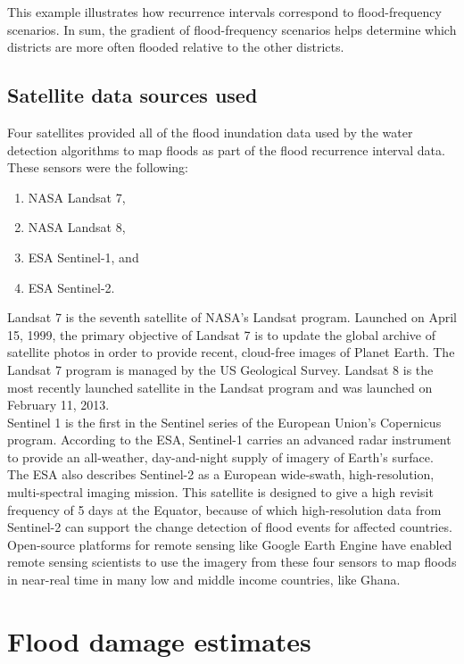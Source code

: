 This example illustrates how recurrence intervals correspond to flood-frequency scenarios. In sum, the gradient of flood-frequency scenarios helps determine which districts are more often flooded relative to the other districts.

\subsection{Satellite data sources used}

Four satellites provided all of the flood inundation data used by the water detection algorithms to map floods as part of the flood recurrence interval data. These sensors were the following:

\begin{enumerate}
  \item NASA Landsat 7,
  \item NASA Landsat 8,
  \item ESA Sentinel-1, and
  \item ESA Sentinel-2.
\end{enumerate}

Landsat 7 is the seventh satellite of NASA’s Landsat program. Launched on April 15, 1999, the primary objective of Landsat 7 is to update the global archive of satellite photos in order to provide recent, cloud-free images of Planet Earth.\cite{landsat} The Landsat 7 program is managed by the US Geological Survey. Landsat 8 is the most recently launched satellite in the Landsat program and was launched on February 11, 2013.\\

Sentinel 1 is the first in the Sentinel series of the European Union’s Copernicus program. According to the ESA\cite{sentinel1}, Sentinel-1 carries an advanced radar instrument to provide an all-weather, day-and-night supply of imagery of Earth’s surface. The ESA also describes Sentinel-2\cite{sentinel2} as a European wide-swath, high-resolution, multi-spectral imaging mission. This satellite is designed to give a high revisit frequency of 5 days at the Equator, because of which high-resolution data from Sentinel-2 can support the change detection of flood events for affected countries. Open-source platforms for remote sensing like Google Earth Engine have enabled remote sensing scientists to use the imagery from these four sensors to map floods in near-real time in many low and middle income countries, like Ghana.

\section{Flood damage estimates}

